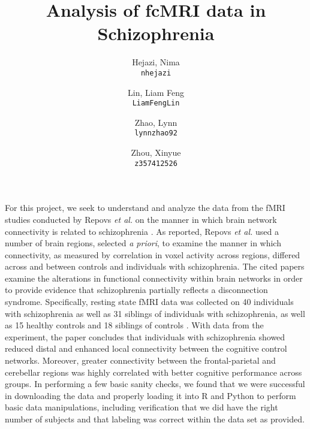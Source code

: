 \documentclass[11pt]{article}
\title{Analysis of fcMRI data in Schizophrenia}
\author{
  Hejazi, Nima\\
  \texttt{nhejazi}
  \and
  Lin, Liam Feng\\
  \texttt{LiamFengLin}
  \and
  Zhao, Lynn\\
  \texttt{lynnzhao92}
  \and
  Zhou, Xinyue\\
  \texttt{z357412526}
}
\begin{document}
\maketitle

For this project, we seek to understand and analyze the data from the fMRI studies
conducted by Repovs \textit{et al.} on the manner in which brain network connectivity is
related to schizophrenia \cite{repovs2011,repovs2012}. As reported, Repovs \textit{et al.}
used a number of brain regions, selected \textit{a priori}, to examine the manner in which 
connectivity, as measured by correlation in voxel activity across regions, differed across
and between controls and individuals with schizophrenia. The cited papers examine the 
alterations in functional connectivity within brain networks in order to provide evidence 
that schizophrenia partially reflects a disconnection syndrome. Specifically, resting state 
fMRI data was collected on 40 individuals with schizophrenia as well as 31 siblings of 
individuals with schizophrenia, as well as 15 healthy controls and 18 siblings of controls
\cite{repovs2011}. With data from the experiment, the paper concludes that individuals 
with schizophrenia showed reduced distal and enhanced local connectivity between the 
cognitive control networks. Moreover, greater connectivity between the frontal-parietal 
and cerebellar regions was highly correlated with better cognitive performance across 
groups. In performing a few basic sanity checks, we found that we were successful in 
downloading the data and properly loading it into R and Python to perform basic data 
manipulations, including verification that we did have the right number of subjects and 
that labeling was correct within the data set as provided.
\end{document}
